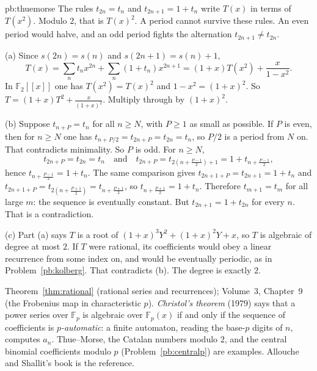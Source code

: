 \begin{solution}{pb:thuemorse}
\idea The rules $t_{2n}=t_n$ and $t_{2n+1}=1+t_n$ write $T(x)$ in terms of $T(x^2)$. Modulo $2$, that is $T(x)^2$. A period cannot survive these rules.
An even period would halve, and an odd period fights the alternation $t_{2n+1}\ne t_{2n}$.

\writeup (a) Since $s(2n)=s(n)$ and $s(2n+1)=s(n)+1$,
\[
T(x)=\sum_nt_nx^{2n}+\sum_n(1+t_n)x^{2n+1}=(1+x)T(x^2)+\frac x{1-x^2}.
\]
In $\mathbb F_2[[x]]$ one has $T(x^2)=T(x)^2$ and $1-x^2=(1+x)^2$. So $T=(1+x)T^2+\frac x{(1+x)^2}$. Multiply through by $(1+x)^2$.

(b) Suppose $t_{n+P}=t_n$ for all $n\ge N$, with $P\ge1$ as small as possible. If $P$ is even, then for $n\ge N$ one has $t_{n+P/2}=t_{2n+P}=t_{2n}=t_n$, so $P/2$ is a
period from $N$ on. That contradicts minimality. So $P$ is odd. For $n\ge N$,
\[
t_{2n+P}=t_{2n}=t_n\quad\text{and}\quad t_{2n+P}=t_{2(n+\frac{P-1}2)+1}=1+t_{n+\frac{P-1}2},
\]
hence $t_{n+\frac{P-1}2}=1+t_n$. The same comparison gives $t_{2n+1+P}=t_{2n+1}=1+t_n$ and $t_{2n+1+P}=t_{2(n+\frac{P+1}2)}=t_{n+\frac{P+1}2}$, so $t_{n+\frac{P+1}2}=1+t_n$.
Therefore $t_{m+1}=t_m$ for all large $m$: the sequence is eventually constant. But $t_{2n+1}=1+t_{2n}$ for every $n$. That is a contradiction.

(c) Part (a) says $T$ is a root of $(1+x)^3Y^2+(1+x)^2Y+x$, so $T$ is algebraic of degree at most $2$. If $T$ were rational, its coefficients
would obey a linear recurrence from some index on, and would be eventually periodic, as in Problem~\ref{pb:kolberg}. That contradicts
(b). The degree is exactly $2$.

\tools Theorem~\ref{thm:rational} (rational series and recurrences); Volume~3, Chapter~9 (the Frobenius map in characteristic $p$).
\leads \emph{Christol's theorem} (1979) says that a power series over $\mathbb F_p$ is algebraic over $\mathbb F_p(x)$ if and only if the sequence
of coefficients is \emph{$p$-automatic}: a finite automaton, reading the base-$p$ digits of $n$, computes $a_n$. Thue--Morse,
the Catalan numbers modulo $2$, and the central binomial coefficients modulo $p$ (Problem~\ref{pb:centralp}) are examples. Allouche and Shallit's book is the reference.
\end{solution}

